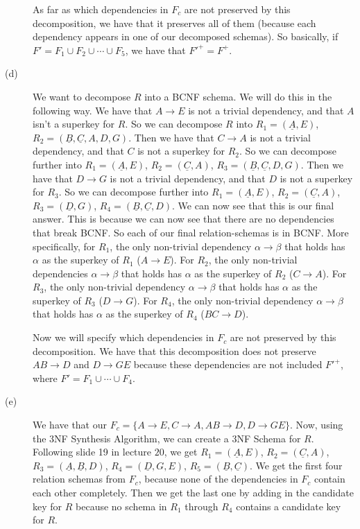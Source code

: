\documentclass{article}
\begin{document}
\begin{description}
        As far as which dependencies in $F_c$ are not preserved by this
        decomposition, we have that it preserves all of them (because each
        dependency appears in one of our decomposed schemas). So basically,
        if $F' = F_1 \cup F_2 \cup \cdots \cup F_5$, we have that
        $F'^+ = F^+$.
    \item[(d)] We want to decompose $R$ into a BCNF schema. We will do this
        in the following way. We have that $A \rightarrow E$ is not a trivial
        dependency, and that $A$ isn't a superkey for $R$. So we can decompose
        $R$ into $R_1 = (\underline{A}, E)$, $R_2 = (\underline{B},
        \underline{C}, A, D, G)$. Then we have that $C \rightarrow A$ is
        not a trivial dependency, and that $C$ is not a superkey for $R_2$.
        So we can decompose further into $R_1 = (\underline{A}, E)$,
        $R_2 = (\underline{C}, A)$, $R_3 = (\underline{B}, \underline{C},
        D, G)$. Then we have that $D \rightarrow G$ is not a trivial
        dependency, and that $D$ is not a superkey for $R_3$. So we can
        decompose further into $R_1 = (\underline{A}, E)$,
        $R_2 = (\underline{C}, A)$, $R_3 = (\underline{D}, G)$,
        $R_4 = (\underline{B}, \underline{C}, D)$. We can now see that this
        is our final answer. This is because we can now see that there are
        no dependencies that break BCNF. So each of our final relation-schemas
        is in BCNF. More specifically, for $R_1$, the only non-trivial
        dependency $\alpha \rightarrow \beta$ that holds has $\alpha$ as
        the superkey of $R_1$ ($A \rightarrow E$).
        For $R_2$, the only non-trivial
        dependencies $\alpha \rightarrow \beta$ that holds has $\alpha$ as
        the superkey of $R_2$ ($C \rightarrow A$).
        For $R_3$, the only non-trivial
        dependency $\alpha \rightarrow \beta$ that holds has $\alpha$ as
        the superkey of $R_3$ ($D \rightarrow G$).
        For $R_4$, the only non-trivial
        dependency $\alpha \rightarrow \beta$ that holds has $\alpha$ as
        the superkey of $R_4$ ($BC \rightarrow D$).

        Now we will specify which dependencies in $F_c$ are not preserved by
        this decomposition. We have that this decomposition does not preserve
        $AB \rightarrow D$ and $D \rightarrow GE$ because these dependencies
        are not included $F'^+$, where $F' = F_1 \cup \cdots \cup F_4$.
    \item[(e)]
        We have that our $F_c = \{A \rightarrow E, C \rightarrow A,
        AB \rightarrow D, D \rightarrow GE\}$. Now, using the 3NF Synthesis
        Algorithm, we can create a 3NF Schema for $R$. Following slide 19
        in lecture $20$, we get
        $R_1 = (\underline{A},E)$, $R_2 = (\underline{C}, A)$,
        $R_3 = (\underline{A}, \underline{B}, D)$, $R_4 = (\underline{D}, G, E)$,
        $R_5 = (\underline{B}, \underline{C})$. We get the first four
        relation schemas from $F_c$, because none of the dependencies in $F_c$
        contain each other completely. Then we get the last one by adding
        in the candidate key for $R$ because no schema in $R_1$ through $R_4$
        contains a candidate key for $R$.
\end{description}
\end{document}
